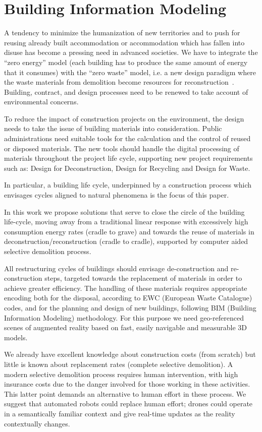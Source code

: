 \section{Building Information Modeling}
\label{sec:chapter_1_section_1}
\noindent
A tendency to minimize the humanization of new territories and to push for reusing already  built accommodation or accommodation which has fallen into disuse has become a pressing need in advanced societies. We have to integrate the ``zero energy'' model (each building has to produce the same amount of energy that it consumes) with the ``zero waste'' model, i.e. a new design paradigm where the waste materials from demolition become resources for reconstruction~\cite{altamura:12}. Building, contract, and design processes need to be renewed to take account of environmental concerns.

To reduce the impact of construction projects on the environment, the design needs to take the issue of building materials into consideration. Public administrations need suitable tools for the calculation and the control of reused or disposed materials. The new tools should handle the digital processing of materials throughout the project life cycle, supporting new project requirements such as: Design for Deconstruction, Design for Recycling and Design for Waste.

In particular, a building life cycle, underpinned by a construction process which envisages cycles aligned to natural phenomena is the focus of this paper.

In this work we propose solutions that serve to close the circle of the building life-cycle, moving away from a traditional linear response with excessively high consumption energy rates (cradle to grave) and towards the reuse of materials in deconstruction/reconstruction (cradle to cradle), supported by computer aided selective demolition process.

All restructuring cycles of buildings should envisage de-construction and re-construction steps, targeted towards the replacement of materials in order to achieve greater efficiency. The handling of these materials requires appropriate encoding both for the disposal, according to EWC (European Waste Catalogue) codes, and for the planning and design of new buildings, following BIM (Building Information Modeling) methodology. For this purpose we need geo-referenced scenes of augmented reality based on fast, easily navigable and measurable 3D models.

We already have excellent knowledge about construction costs (from scratch) but little is known about replacement rates (complete selective demolition). A modern selective demolition process requires human intervention, with high insurance costs due to the danger involved for those working in these activities. This latter point demands an alternative to human effort in these process. We suggest that automated robots could replace human effort; drones could operate in a semantically familiar context and give real-time updates as the reality contextually changes.

